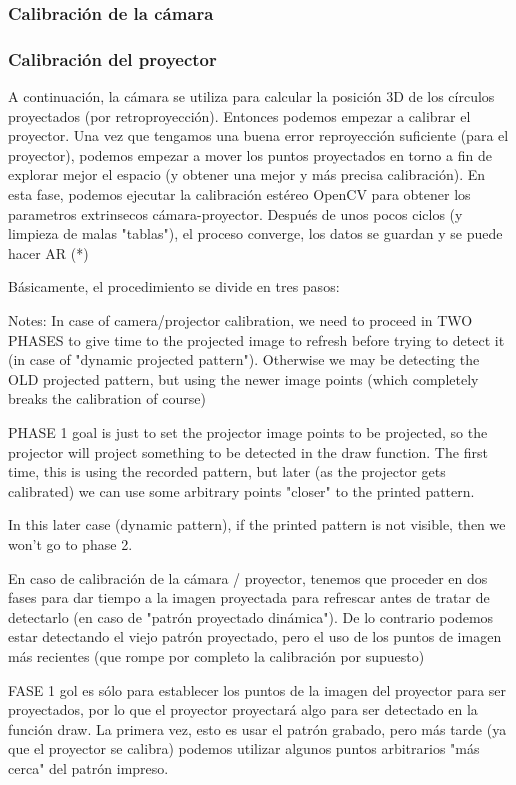 \subsubsection{Calibración de la cámara}

\subsubsection{Calibración del proyector}

A continuación, la cámara se utiliza para calcular la posición 3D de los círculos proyectados (por retroproyección). Entonces podemos empezar a calibrar el proyector. Una vez que tengamos una buena error reproyección suficiente (para el proyector), podemos empezar a mover los puntos proyectados en torno a fin de explorar mejor el espacio (y obtener una mejor y más precisa calibración). En esta fase, podemos ejecutar la calibración estéreo OpenCV para obtener los parametros extrinsecos cámara-proyector. Después de unos pocos ciclos (y limpieza de malas "tablas"), el proceso converge, los datos se guardan y se puede hacer AR (*) 

Básicamente, el procedimiento se divide en tres pasos: 

 Notes: In case of camera/projector calibration, we need to proceed in TWO PHASES to give time to the projected image to refresh before trying to detect it (in case of "dynamic projected pattern"). Otherwise we may be detecting the OLD projected pattern, but using the newer image points (which completely breaks the calibration of course)
                
PHASE 1 goal is just to set the projector image points to be projected, so the projector  will project something to be detected in the draw function. The first time, this is using the recorded pattern, but later (as the projector gets calibrated) we can use some arbitrary points "closer" to the printed pattern.

In this later case (dynamic pattern), if the printed pattern is not visible, then we won't go to phase 2. 
                

En caso de calibración de la cámara / proyector, tenemos que proceder en dos fases para dar tiempo a la imagen proyectada para refrescar antes de tratar de detectarlo (en caso de "patrón proyectado dinámica"). De lo contrario podemos estar detectando el viejo patrón proyectado, pero el uso de los puntos de imagen más recientes (que rompe por completo la calibración por supuesto) 

FASE 1 gol es sólo para establecer los puntos de la imagen del proyector para ser proyectados, por lo que el proyector proyectará algo para ser detectado en la función draw. La primera vez, esto es usar el patrón grabado, pero más tarde (ya que el proyector se calibra) podemos utilizar algunos puntos arbitrarios "más cerca" del patrón impreso.




